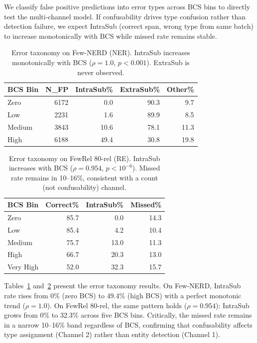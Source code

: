 \documentclass[11pt,a4paper]{article}
\begin{document}
We classify false positive predictions into error types across BCS bins to directly test the multi-channel model. If confusability drives type confusion rather than detection failure, we expect IntraSub (correct span, wrong type from same batch) to increase monotonically with BCS while missed rate remains stable.

\begin{table}[t]
\centering
\caption{Error taxonomy on Few-NERD (NER). IntraSub increases monotonically with BCS ($\rho{=}1.0$, $p{<}0.001$). ExtraSub is never observed.}
\label{tab:error-ner}
\begin{tabular}{lrrrr}
\toprule
BCS Bin & N\_FP & IntraSub\% & ExtraSub\% & Other\% \\
\midrule
Zero    & 6172 & 0.0  & 90.3 & 9.7  \\
Low     & 2231 & 1.6  & 89.9 & 8.5  \\
Medium  & 3843 & 10.6 & 78.1 & 11.3 \\
High    & 6188 & 49.4 & 30.8 & 19.8 \\
\bottomrule
\end{tabular}
\end{table}

\begin{table}[t]
\centering
\caption{Error taxonomy on FewRel 80-rel (RE). IntraSub increases with BCS ($\rho{=}0.954$, $p{<}10^{-6}$). Missed rate remains in 10--16\%, consistent with a count (not confusability) channel.}
\label{tab:error-re}
\begin{tabular}{lrrr}
\toprule
BCS Bin    & Correct\% & IntraSub\% & Missed\% \\
\midrule
Zero       & 85.7 & 0.0  & 14.3 \\
Low        & 85.4 & 4.2  & 10.4 \\
Medium     & 75.7 & 13.0 & 11.3 \\
High       & 66.7 & 20.3 & 13.0 \\
Very High  & 52.0 & 32.3 & 15.7 \\
\bottomrule
\end{tabular}
\end{table}

Tables~\ref{tab:error-ner} and~\ref{tab:error-re} present the error taxonomy results. On Few-NERD, IntraSub rate rises from 0\% (zero BCS) to 49.4\% (high BCS) with a perfect monotonic trend ($\rho{=}1.0$). On FewRel 80-rel, the same pattern holds ($\rho{=}0.954$): IntraSub grows from 0\% to 32.3\% across five BCS bins. Critically, the missed rate remains in a narrow 10--16\% band regardless of BCS, confirming that confusability affects type assignment (Channel 2) rather than entity detection (Channel 1).
\end{document}
